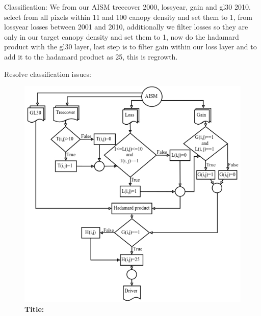 			Classification: We from our AISM treecover 2000, lossyear, gain and gl30 2010. select from all pixels within 11 and 100 canopy density and set them to 1, from lossyear losses between 2001 and 2010, additionally  we filter losses so they are only in our target canopy density and set them to 1, now do the hadamard product with the gl30 layer, last step is to filter gain within our loss layer and to add it to the hadamard product as 25, this is regrowth.

			Resolve classification issues: 
			\begin{figure}[ht]
				\centering
				\includegraphics[scale=0.5]{img/driver_flowchart}
				\caption[]{\textbf{Title:}}
				\label{fig:driver_flowchart}
			\end{figure}

